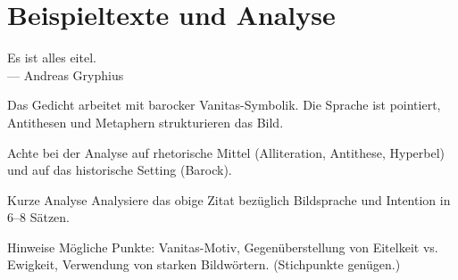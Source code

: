 \documentclass[11pt,a4paper,oneside]{article}
\begin{document}
	\section{Beispieltexte und Analyse}
	
	\begin{zitat}
		Es ist alles eitel. \\
		— Andreas Gryphius
	\end{zitat}
	
	\begin{interpret}
		Das Gedicht arbeitet mit barocker Vanitas-Symbolik. Die Sprache ist pointiert, Antithesen und Metaphern strukturieren das Bild.
	\end{interpret}
	
	\begin{hinweis}
		Achte bei der Analyse auf rhetorische Mittel (Alliteration, Antithese, Hyperbel) und auf das historische Setting (Barock).
	\end{hinweis}
	
	\begin{aufgabe}{Kurze Analyse}
		Analysiere das obige Zitat bezüglich Bildsprache und Intention in 6–8 Sätzen.
	\end{aufgabe}
	
	\begin{loesung}{Hinweise}
		Mögliche Punkte: Vanitas-Motiv, Gegenüberstellung von Eitelkeit vs. Ewigkeit, Verwendung von starken Bildwörtern. (Stichpunkte genügen.)
	\end{loesung}
	
\end{document}
